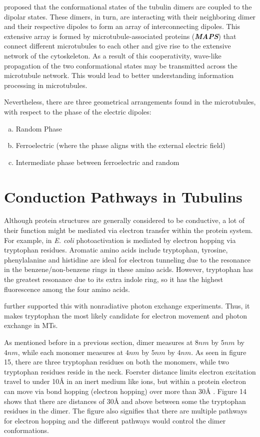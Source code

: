 \documentclass[letterpaper,final,times]{cas-dc}
\numberwithin{equation}{section}
\begin{document}
\citet{25} proposed that the conformational states of the tubulin dimers are coupled to the dipolar states. These dimers, in turn, are interacting with their neighboring dimer and their respective dipoles to form an array of interconnecting dipoles\citep{10}. This extensive array is formed by microtubule-associated proteins (\textbf{\textit{MAPS}}) that connect different microtubules to each other and give rise to the extensive network of the cytoskeleton. As a result of this cooperativity, wave-like propagation of the two conformational states may be transmitted
across the microtubule network. This would lead to better understanding information
processing in microtubules.

Nevertheless, there are three geometrical arrangements found in the microtubules\citep{10}, with respect to the phase of the electric dipoles:
\begin{enumerate}[a)]
    \item Random Phase
    \item Ferroelectric (where the phase aligns with the external electric field)
    \item Intermediate phase between ferroelectric and random
\end{enumerate}

\section{Conduction Pathways in Tubulins}\noindent
Although protein structures are generally considered to be conductive, a lot of their function might be mediated via electron transfer within the protein system. For example, in \textit{E. coli} photoactivation is mediated by electron hopping via tryptophan residues. Aromatic amino acids include tryptophan, tyrosine, phenylalanine and histidine are ideal for electron tunneling due to the resonance in the benzene/non-benzene rings in these amino acids. However, tryptophan has the greatest resonance due to its extra indole ring, so it has the highest fluorescence among the four amino acids.

\citet{113} further supported this with nonradiative photon exchange experiments. Thus, it makes tryptophan the most likely candidate for electron movement and photon exchange in MTs.

As mentioned before in a previous section, dimer measures at $8nm$ by $5nm$ by $4nm$, while each monomer measures at $4nm$ by $5nm$ by $4nm$. As seen in figure 15, there are three tryptophan residues on both the monomers, while two tryptophan residues reside in the neck. Foerster distance limits electron excitation travel to under 10Å in an inert medium like ions, but within a protein electron can move via bond hopping (electron hopping) over more than 30Å \citep{10}. Figure 14 shows that there are distances of 30Å and above between some the tryptophan residues in the dimer. The figure also signifies that there are multiple pathways for electron hopping and the different pathways would control the dimer conformations.
\end{document}

